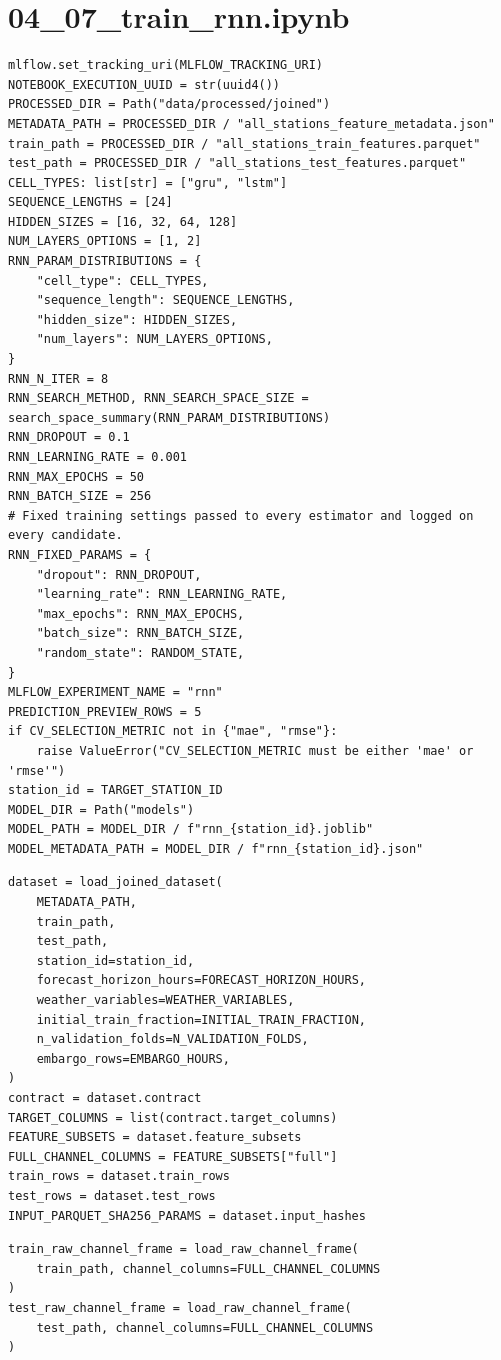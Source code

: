 \section{04\_07\_train\_rnn.ipynb}

\begin{verbatim}
mlflow.set_tracking_uri(MLFLOW_TRACKING_URI)
NOTEBOOK_EXECUTION_UUID = str(uuid4())
PROCESSED_DIR = Path("data/processed/joined")
METADATA_PATH = PROCESSED_DIR / "all_stations_feature_metadata.json"
train_path = PROCESSED_DIR / "all_stations_train_features.parquet"
test_path = PROCESSED_DIR / "all_stations_test_features.parquet"
CELL_TYPES: list[str] = ["gru", "lstm"]
SEQUENCE_LENGTHS = [24]
HIDDEN_SIZES = [16, 32, 64, 128]
NUM_LAYERS_OPTIONS = [1, 2]
RNN_PARAM_DISTRIBUTIONS = {
    "cell_type": CELL_TYPES,
    "sequence_length": SEQUENCE_LENGTHS,
    "hidden_size": HIDDEN_SIZES,
    "num_layers": NUM_LAYERS_OPTIONS,
}
RNN_N_ITER = 8
RNN_SEARCH_METHOD, RNN_SEARCH_SPACE_SIZE = search_space_summary(RNN_PARAM_DISTRIBUTIONS)
RNN_DROPOUT = 0.1
RNN_LEARNING_RATE = 0.001
RNN_MAX_EPOCHS = 50
RNN_BATCH_SIZE = 256
# Fixed training settings passed to every estimator and logged on every candidate.
RNN_FIXED_PARAMS = {
    "dropout": RNN_DROPOUT,
    "learning_rate": RNN_LEARNING_RATE,
    "max_epochs": RNN_MAX_EPOCHS,
    "batch_size": RNN_BATCH_SIZE,
    "random_state": RANDOM_STATE,
}
MLFLOW_EXPERIMENT_NAME = "rnn"
PREDICTION_PREVIEW_ROWS = 5
if CV_SELECTION_METRIC not in {"mae", "rmse"}:
    raise ValueError("CV_SELECTION_METRIC must be either 'mae' or 'rmse'")
station_id = TARGET_STATION_ID
MODEL_DIR = Path("models")
MODEL_PATH = MODEL_DIR / f"rnn_{station_id}.joblib"
MODEL_METADATA_PATH = MODEL_DIR / f"rnn_{station_id}.json"
\end{verbatim}

\begin{verbatim}
dataset = load_joined_dataset(
    METADATA_PATH,
    train_path,
    test_path,
    station_id=station_id,
    forecast_horizon_hours=FORECAST_HORIZON_HOURS,
    weather_variables=WEATHER_VARIABLES,
    initial_train_fraction=INITIAL_TRAIN_FRACTION,
    n_validation_folds=N_VALIDATION_FOLDS,
    embargo_rows=EMBARGO_HOURS,
)
contract = dataset.contract
TARGET_COLUMNS = list(contract.target_columns)
FEATURE_SUBSETS = dataset.feature_subsets
FULL_CHANNEL_COLUMNS = FEATURE_SUBSETS["full"]
train_rows = dataset.train_rows
test_rows = dataset.test_rows
INPUT_PARQUET_SHA256_PARAMS = dataset.input_hashes
\end{verbatim}

\begin{verbatim}
train_raw_channel_frame = load_raw_channel_frame(
    train_path, channel_columns=FULL_CHANNEL_COLUMNS
)
test_raw_channel_frame = load_raw_channel_frame(
    test_path, channel_columns=FULL_CHANNEL_COLUMNS
)
\end{verbatim}

